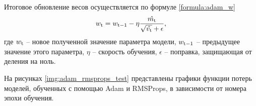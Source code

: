 Итоговое обновление весов осуществляется по формуле 
\ref{formula:adam_w}
\begin{equation}\label{formula:adam_w}
w_{\rm{t}} = w_{\rm{t-1}} - \eta\frac{\hat{m_{\rm{t}}}}{\sqrt{\hat{v_{\rm{t}}}} + \epsilon},
\end{equation}
где $w_{\rm{t}}$ -- новое полученной значение параметра модели, $w_{\rm{t-1}}$ -- предыдущее значение этого параметра, $\eta$ -- скорость обучения, $\epsilon$ -- поправка, защищающая от деления на ноль.

На рисунках \ref{img:adam_rmsprops_test} представлены графики функции потерь моделей, обученных с помощью Adam и RMSProps, в зависимости от номера эпохи обучения.

%		
%		
%		
%		
%		
%		
%		
%		
